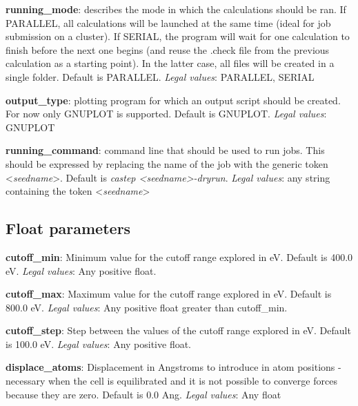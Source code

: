 \documentclass[10pt]{article}
\begin{document}
\textbf{running\_mode}: describes the mode in which the calculations should be ran. If PARALLEL, all calculations will be launched at the same time (ideal for job submission on a cluster). If SERIAL, the program will wait for one calculation to finish before the next one begins (and reuse the .check file from the previous calculation as a starting point). In the latter case, all files will be created in a single folder. Default is PARALLEL.\newline
\textit{Legal values}: PARALLEL, SERIAL\newline

\textbf{output\_type}: plotting program for which an output script should be created. For now only GNUPLOT is supported. Default is GNUPLOT.\newline
\textit{Legal values}: GNUPLOT\newline

\textbf{running\_command}: command line that should be used to run jobs. This should be expressed by replacing the name of the job with the generic token \textless \textit{seedname}\textgreater. Default is \textit{castep \textless seedname\textgreater -dryrun}.\newline
\textit{Legal values}: any string containing the token \textless \textit{seedname}\textgreater\newline

\subsection{Float parameters}

\textbf{cutoff\_min}: Minimum value for the cutoff range explored in eV. Default is 400.0 eV.\newline
\textit{Legal values}: Any positive float.\newline

\textbf{cutoff\_max}: Maximum value for the cutoff range explored in eV. Default is 800.0 eV.\newline
\textit{Legal values}: Any positive float greater than cutoff\_min.\newline

\textbf{cutoff\_step}: Step between the values of the cutoff range explored in eV. Default is 100.0 eV.\newline
\textit{Legal values}: Any positive float.\newline

\textbf{displace\_atoms}: Displacement in Angstroms to introduce in atom positions - necessary when the cell is equilibrated and it is not possible to converge forces because they are zero. Default is 0.0 Ang.\newline
\textit{Legal values}: Any float\newline
\end{document}

